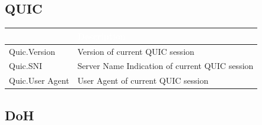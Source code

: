 \subsection*{\hypertarget{link:QUIC}{QUIC}}
\label{sec:appendix_c:protocol:QUIC}

\begin{longtable}{p{}|p{}}   
    \rowcolor{black}\multicolumn{1}{l!\vlinewhite}{\textcolor{white}{Field}}  & \textcolor{white}{Description} \\\hline
    Quic.Version &	Version of current QUIC session \\\hline 
    Quic.SNI &	Server Name Indication of current QUIC session \\\hline 
    Quic.User Agent &	User Agent of current QUIC session \\\hline     
\end{longtable}   

\subsection*{\hypertarget{link:DoH}{DoH}}
\label{sec:appendix_c:protocol:DoH}

